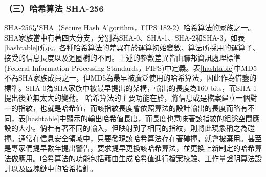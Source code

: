 				\subsubsection{（三）哈希算法 SHA-256}
				SHA-256是SHA（Secure Hash Algorithm，FIPS 182-2）\supercite{DBLP:conf/fse/KhovratovichRS12}哈希算法的家族之一。SHA家族當中有著四大分支，分別為SHA-0、SHA-1、SHA-2和SHA-3，如表\ref{hashtable}所示。各種哈希算法的差異在於運算初始變數、算法所採用的運算子、接受的信息長度以及迴圈樹的不同。上述的參數差異皆由聯邦資訊處理標準(Federal Information Processing Standards，FIPS)中定義。表\ref{hashtable}中MD5不為SHA家族成員之一，但MD5為最早被廣泛使用的哈希算法，因此作為借鑒的標準。SHA-0為SHA家族中被最早提出的架構，輸出的長度為160 bits，而SHA-1提出後並無太大的變動。
				哈希算法的主要功能在於，將信息或是檔案建立一個對一的指紋，也就是哈希值，而該指紋長度會依照算法的設計輸出的長度而略有不同，表\ref{hashtable}中顯示的輸出哈希值長度，而長度也意味著該指紋的組態空間應設的大小。倘若有著不同的輸入，但映射到了相同的指紋，則將此現象稱之為碰撞。通常在信息安全領域中，只要發現該哈希算法存在著碰撞，就會被棄用。甚至是專家們提早數年提出警告，要求提早更換該哈希算法，並更換上新制定的哈希算法做應用。哈希算法的功能包括藉由生成哈希值進行檔案校驗、工作量證明算法設計以及區塊鏈中的哈希指針。

